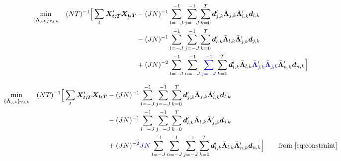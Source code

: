 \documentclass{article}
\numberwithin{equation}{section}
\let \oldsum \sum
\renewcommand{\sum}{\displaystyle \oldsum}
\newcommand{\X}[1]{\bm{X_{#1;T}}}
\newcommand{\scalesum}{\sum_{j=-J}^{-1}}
\newcommand{\scalesumi}{\sum_{l=-J}^{-1}}
\newcommand{\locsum}{\sum_{k=0}^{T}}
\newcommand{\coeffs}[2]{\bm{d}_{#1,#2}}
\newcommand{\optLoadings}[2]{\bar{\bm{\Lambda}}_{#1,#2}}
\newcommand{\setOptLoadings}{\{ \bar{\bm{\Lambda}}_{j,k} \}_{\forall j,k}}
\begin{document}
	\begin{align*}
		\min_{\setOptLoadings} \quad (NT)^{-1} \Big[ \sum_t \X{t}'\X{t} &- (JN)^{-1}\scalesumi \scalesum \locsum \coeffs{j}{k}' \optLoadings{j}{k}\optLoadings{l}{k}' \coeffs{l}{k} \\
		&- (JN)^{-1}\scalesumi \scalesum \locsum \coeffs{l}{k}' \optLoadings{l}{k} \optLoadings{j}{k}' \coeffs{j}{k} \\
	       &+ (JN)^{-2}\scalesumi \sum_{n=-J}^{-1} \textcolor{blue}{\scalesum} \locsum \coeffs{l}{k}' \optLoadings{l}{k} \textcolor{blue}{\optLoadings{j}{k}' \optLoadings{j}{k}} \optLoadings{n}{k}' \coeffs{n}{k} \Big]
	\end{align*}

	\begin{align*}
		\min_{\setOptLoadings} \quad (NT)^{-1} \Big[ \sum_t \X{t}'\X{t} &- (JN)^{-1}\scalesumi \scalesum \locsum \coeffs{j}{k}' \optLoadings{j}{k}\optLoadings{l}{k}' \coeffs{l}{k} \\
		&- (JN)^{-1}\scalesumi \scalesum \locsum \coeffs{l}{k}' \optLoadings{l}{k} \optLoadings{j}{k}' \coeffs{j}{k} \\
	       &+ (JN)^{-2} \textcolor{blue}{JN}\scalesumi \sum_{n=-J}^{-1} \scalesum \locsum \coeffs{l}{k}' \optLoadings{l}{k} \optLoadings{n}{k}' \coeffs{n}{k} \Big] 			&\quad \text{from } \eqref{eq:constraint}
	\end{align*}
\end{document}
